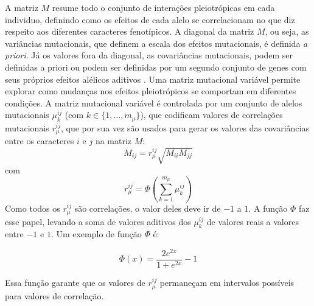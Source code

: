 A matriz $M$ resume todo o conjunto de interações pleiotrópicas em cada
individuo, definindo como os efeitos de cada alelo se correlacionam no
que diz respeito aos diferentes caracteres fenotípicos.
A diagonal da matriz $M$, ou seja, as variâncias mutacionais, que
definem a escala dos efeitos mutacionais, é definida {\it a priori}.
Já os valores fora da diagonal, as covariâncias mutacionais, podem ser
definidas a priori \citep{Jones2003, Jones2004} ou podem ser definidas
por um segundo conjunto de genes com seus próprios efeitos alélicos
aditivos \citep{Jones2007}.
Uma matriz mutacional variável permite explorar como mudanças nos
efeitos pleiotrópicos se comportam em diferentes condições.
A matriz mutacional variável é controlada por um conjunto de alelos mutacionais
$\mu^{ij}_k$ (com $k \in \{1,\ldots,m_\mu\}$), que codificam valores de
correlações mutacionais $r_\mu^{ij}$, que por sua vez são usados para gerar
os valores das covariâncias entre os caracteres $i$ e $j$ na matriz $M$:
\begin{equation}
M_{ij} = r_\mu^{ij} \sqrt {M_{ii}M_{jj}}
\end{equation}
com
\begin{equation}
r_\mu^{ij} = \Phi \left(\sum_{k=1}^{m_\mu} \mu^{ij}_k\right)
\end{equation}
Como todos os $r_\mu^{ij}$ são correlações, o valor deles deve ir de
$-1$ a $1$.
A função $\Phi$ faz esse papel, levando a soma de valores
aditivos dos $\mu^{ij}_k$ de valores reais a valores entre $-1$ e $1$.
Um exemplo de função $\Phi$ \citep[usado em][]{Jones2007} é:

\begin{equation}
\Phi (x) = \frac{2e^{2x}}{1+e^{2x}} - 1
\end{equation}

Essa função garante que os valores de $r_\mu^{ij}$ permaneçam em
intervalos possíveis para valores de correlação.

